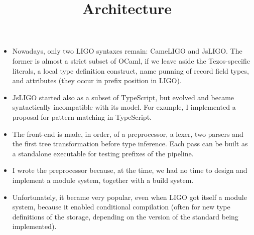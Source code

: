\documentclass[wide]{slides}
\newcommand{\JsLIGO}[0]{\textsf{JsLIGO}}
\newcommand{\CameLIGO}[0]{\textsf{CameLIGO}}
\newcommand{\OCaml}[0]{\textsf{OCaml}}
\newcommand{\TypeScript}[0]{\textsf{TypeScript}}
\begin{document}
\begin{slide}
  \title{Architecture}

  \begin{itemize}

    \item Nowadays, only two LIGO syntaxes remain: \CameLIGO{} and
      \JsLIGO{}. The former is almost a strict subset of \OCaml{}, if
      we leave aside the Tezos\hyp{}specific literals, a local type
      definition construct, name punning of record field types, and
      attributes (they occur in prefix position in LIGO).

    \item \JsLIGO{} started also as a subset of \TypeScript{}, but
      evolved and became syntactically incompatible with its
      model. For example, I implemented a proposal for pattern
      matching in \TypeScript{}.

    \item The front-end is made, in order, of a preprocessor, a lexer,
      two parsers and the first tree transformation before type
      inference. Each pass can be built as a standalone executable for
      testing prefixes of the pipeline.

    \item I wrote the preprocessor because, at the time, we had no
      time to design and implement a module system, together with a
      build system.

    \item Unfortunately, it became very popular, even when LIGO got
      itself a module system, because it enabled conditional
      compilation (often for new type definitions of the storage,
      depending on the version of the standard being implemented).

  \end{itemize}
\end{slide}
\end{document}
